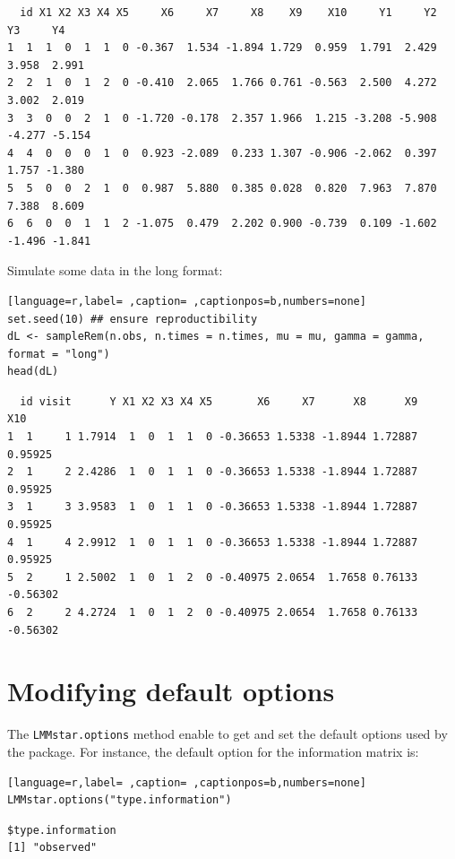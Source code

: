 \documentclass[12pt]{article}
\begin{document}
\begin{verbatim}
  id X1 X2 X3 X4 X5     X6     X7     X8    X9    X10     Y1     Y2     Y3     Y4
1  1  1  0  1  1  0 -0.367  1.534 -1.894 1.729  0.959  1.791  2.429  3.958  2.991
2  2  1  0  1  2  0 -0.410  2.065  1.766 0.761 -0.563  2.500  4.272  3.002  2.019
3  3  0  0  2  1  0 -1.720 -0.178  2.357 1.966  1.215 -3.208 -5.908 -4.277 -5.154
4  4  0  0  0  1  0  0.923 -2.089  0.233 1.307 -0.906 -2.062  0.397  1.757 -1.380
5  5  0  0  2  1  0  0.987  5.880  0.385 0.028  0.820  7.963  7.870  7.388  8.609
6  6  0  0  1  1  2 -1.075  0.479  2.202 0.900 -0.739  0.109 -1.602 -1.496 -1.841
\end{verbatim}


Simulate some data in the long format:
\begin{lstlisting}[language=r,label= ,caption= ,captionpos=b,numbers=none]
set.seed(10) ## ensure reproductibility
dL <- sampleRem(n.obs, n.times = n.times, mu = mu, gamma = gamma, format = "long")
head(dL)
\end{lstlisting}

\begin{verbatim}
  id visit      Y X1 X2 X3 X4 X5       X6     X7      X8      X9      X10
1  1     1 1.7914  1  0  1  1  0 -0.36653 1.5338 -1.8944 1.72887  0.95925
2  1     2 2.4286  1  0  1  1  0 -0.36653 1.5338 -1.8944 1.72887  0.95925
3  1     3 3.9583  1  0  1  1  0 -0.36653 1.5338 -1.8944 1.72887  0.95925
4  1     4 2.9912  1  0  1  1  0 -0.36653 1.5338 -1.8944 1.72887  0.95925
5  2     1 2.5002  1  0  1  2  0 -0.40975 2.0654  1.7658 0.76133 -0.56302
6  2     2 4.2724  1  0  1  2  0 -0.40975 2.0654  1.7658 0.76133 -0.56302
\end{verbatim}


\clearpage

\section{Modifying default options}
\label{sec:org13e5377}
The \texttt{LMMstar.options} method enable to get and set the default options
used by the package. For instance, the default option for the information matrix is:
\begin{lstlisting}[language=r,label= ,caption= ,captionpos=b,numbers=none]
LMMstar.options("type.information")
\end{lstlisting}

\begin{verbatim}
$type.information
[1] "observed"
\end{verbatim}
\end{document}
